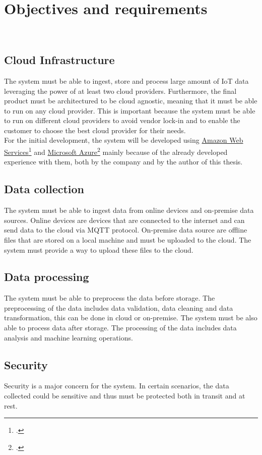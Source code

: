 \chapter{Objectives and requirements}
\label{cap:requirements}
\\

\section{Cloud Infrastructure}
The system must be able to ingest, store and process large amount of IoT data leveraging the power of at least two cloud providers. Furthermore, the final product must be architectured to be cloud agnostic, meaning that it must be able to run on any cloud provider. This is important because the system must be able to run on different cloud providers to avoid vendor lock-in and to enable the customer to choose the best cloud provider for their needs.\\
For the initial development, the system will be developed using \href{https://aws.amazon.com/it/}{Amazon Web Services}\footcite{site:aws} and \href{https://azure.microsoft.com/it-it/}{Microsoft Azure}\footcite{site:azure} mainly because of the already developed
experience with them, both by the company and by the author of this thesis.

\section{Data collection}
The system must be able to ingest data from online devices and on-premise data sources. 
Online devices are devices that are connected to the internet and can send data to the cloud via MQTT protocol.
On-premise data source are offline files that are stored on a local machine and must be uploaded to the cloud. The system must provide a way to upload these files to the cloud.
\section{Data processing}
The system must be able to preprocess the data before storage. The preprocessing of the data includes data validation, data cleaning and data transformation, this can be done in cloud or on-premise. The system must be also able to process data after storage. The processing of the data includes data analysis and machine learning operations. 

\newpage
\section{Security}
Security is a major concern for the system. In certain scenarios, the data collected could be sensitive and thus must be protected both in transit and at rest.
